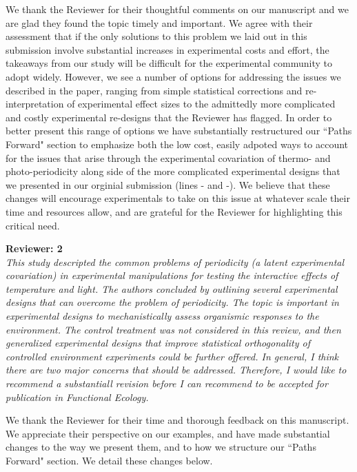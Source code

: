 \documentclass[11pt]{article}
\begin{document}
 We thank the Reviewer for their thoughtful comments on our manuscript and we are glad they found the topic timely and important. We agree with their assessment that if the only solutions to this problem we laid out in this submission involve substantial increases in experimental costs and effort, the takeaways from our study will be difficult for the experimental community to adopt widely. However, we see a number of options for addressing the issues we described in the paper, ranging from simple statistical corrections and re-interpretation of experimental effect sizes to the admittedly more complicated and costly experimental re-designs that the Reviewer has flagged. In order to better present this range of options we have substantially restructured our ``Paths Forward" section to emphasize both the low cost, easily adpoted ways to account for the issues that arise through the experimental covariation of thermo- and photo-periodicity along side of the more complicated experimental designs that we presented in our orginial submission (lines - and -). We believe that these changes will encourage experimentals to take on this issue at whatever scale their time and resources allow, and are grateful for the Reviewer for highlighting this critical need.

\textbf{Reviewer: 2}\\
\emph{This study descripted the common problems of periodicity (a latent experimental covariation) in experimental manipulations for testing the interactive effects of temperature and light. The authors concluded by outlining several experimental designs that can overcome the problem of periodicity. The topic is important in experimental designs to mechanistically assess organismic responses to the environment. The control treatment was not considered in this review, and then generalized experimental designs that improve statistical orthogonality of controlled environment experiments could be further offered. In general, I think there are two major concerns that should be addressed. Therefore, I would like to recommend a substantiall revision before I can recommend to be accepted for publication in Functional Ecology.}

We thank the Reviewer for their time and thorough feedback on this manuscript. We appreciate their perspective on our examples, and have made substantial changes to the way we present them, and to how we structure our ``Paths Forward" section. We detail these changes below.
\end{document}
